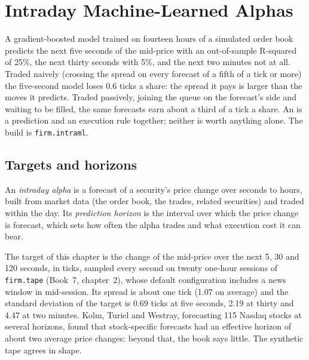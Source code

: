 \chapter{Intraday Machine-Learned Alphas}\label{ch:s1:intraday-machine-learned-alphas}

A gradient-boosted model trained on fourteen hours of a simulated order book predicts the next five seconds of the mid-price with an out-of-sample
R-squared of 25\%, the next thirty seconds with 5\%, and the next two minutes not at all. Traded naively (crossing the spread on every forecast of a fifth
of a tick or more) the five-second model loses 0.6 ticks a share: the spread it pays is larger than the moves it predicts. Traded passively, joining the
queue on the forecast's side and waiting to be filled, the same forecasts earn about a third of a tick a share. An  is a prediction and an
execution rule together; neither is worth anything alone. The build is \texttt{firm.intraml}.

\section{Targets and horizons}

\begin{definition}\label{def:s1:intraday-machine-learned-alphas:alpha}
An \emph{intraday alpha} is a forecast of a security's price change over seconds to hours, built from market data (the order book, the
trades, related securities) and traded within the day. Its \emph{prediction horizon} is the interval over which the price change is
forecast, which sets how often the alpha trades and what execution cost it can bear.
\end{definition}

The target of this chapter is the change of the mid-price over the next 5, 30 and 120 seconds, in ticks, sampled every second on twenty one-hour sessions of
\texttt{firm.tape} (Book~7, chapter~2), whose default configuration includes a news window in mid-session. Its spread is about one tick (1.07 on average) and
the standard deviation of the target is 0.69 ticks at five seconds, 2.19 at thirty and 4.47 at two minutes. Kolm, Turiel and Westray, forecasting 115 Nasdaq
stocks at several horizons, found that stock-specific forecasts had an effective horizon of about two average price changes: beyond that, the book says
little. The synthetic tape agrees in shape.


